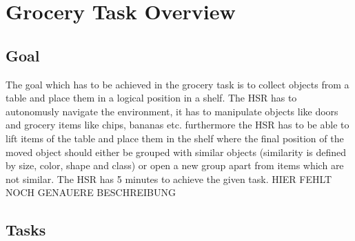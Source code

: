 \documentclass[main.tex]{subfiles}
\begin{document}
	
	\begingroup
	
	\renewcommand{\cleardoublepage}{}
	
	\renewcommand{\clearpage}{}
	
	\chapter{Grocery Task Overview}
	
	
	\chapterauthor{}
	
	\section{Goal}

	The goal which has to be achieved in the grocery task is to collect objects from a table and place them in a logical position in a shelf. The HSR has to autonomusly navigate the environment, it has to manipulate objects like doors and grocery items like chips, bananas etc. furthermore the HSR has to be able to lift items of the table and place them in the shelf where the final position of the moved object should either be grouped with similar objects (similarity is defined by size, color, shape and class) or open a new group apart from items which are not similar. The HSR has 5 minutes to achieve the given task. HIER FEHLT NOCH GENAUERE BESCHREIBUNG
	

	\section{Tasks}
\end{document}
